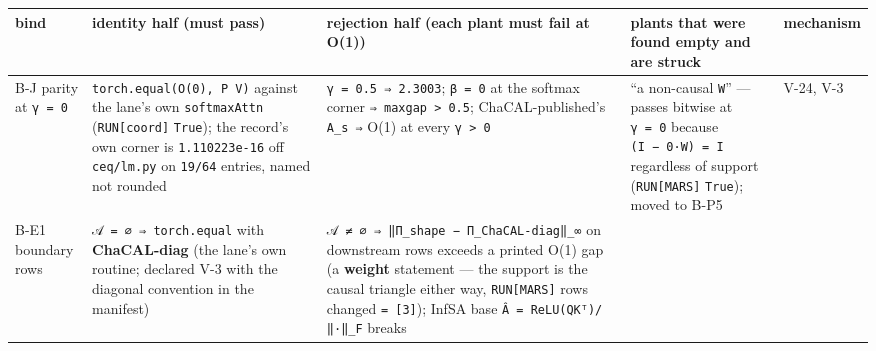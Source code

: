 \documentclass[11pt,a4paper]{article}
\newcounter{none}                 %
\theoremstyle{plain}
\theoremstyle{definition}
\theoremstyle{remark}
\begin{document}
{\def\LTcaptype{none} %
\begin{longtable}[]{@{}
  >{\raggedright\arraybackslash}p{}
  >{\raggedright\arraybackslash}p{}
  >{\raggedright\arraybackslash}p{}
  >{\raggedright\arraybackslash}p{}
  >{\raggedright\arraybackslash}p{}@{}}
\toprule\noalign{}
\begin{minipage}[b]{\linewidth}\raggedright
bind
\end{minipage} & \begin{minipage}[b]{\linewidth}\raggedright
identity half (must pass)
\end{minipage} & \begin{minipage}[b]{\linewidth}\raggedright
rejection half (each plant must fail at O(1))
\end{minipage} & \begin{minipage}[b]{\linewidth}\raggedright
plants that were found empty and are struck
\end{minipage} & \begin{minipage}[b]{\linewidth}\raggedright
mechanism
\end{minipage} \\
\midrule\noalign{}
\endhead
\bottomrule\noalign{}
\endlastfoot
B-J parity at \texttt{γ\ =\ 0} & \texttt{torch.equal(O(0),\ P\ V)}
against the lane's own \texttt{softmaxAttn} (\texttt{RUN{[}coord{]}}
\texttt{True}); the record's own corner is \texttt{1.110223e-16} off
\texttt{ceq/lm.py} on \texttt{19/64} entries, named not rounded &
\texttt{γ\ =\ 0.5\ ⇒\ 2.3003}; \texttt{β\ =\ 0} at the softmax corner
\texttt{⇒\ max\textbar{}gap\textbar{}\ \textgreater{}\ 0.5};
ChaCAL-published's \texttt{A\_s\ ⇒} O(1) at every
\texttt{γ\ \textgreater{}\ 0} & ``a non-causal \texttt{W}'' --- passes
bitwise at \texttt{γ\ =\ 0} because \texttt{(I\ −\ 0·W)\ =\ I}
regardless of support (\texttt{RUN{[}MARS{]}} \texttt{True}); moved to
B-P5 & V-24, V-3 \\
B-E1 boundary rows & \texttt{𝒜\ =\ ∅\ ⇒\ torch.equal} with
\textbf{ChaCAL-diag} (the lane's own routine; declared V-3 with the
diagonal convention in the manifest) &
\texttt{𝒜\ ≠\ ∅\ ⇒\ ‖Π\_shape\ −\ Π\_ChaCAL-diag‖\_∞} on downstream rows
exceeds a printed O(1) gap (a \textbf{weight} statement --- the support
is the causal triangle either way, \texttt{RUN{[}MARS{]}} rows changed
\texttt{=\ {[}3{]}}); InfSA base \texttt{Â\ =\ ReLU(QKᵀ)/‖·‖\_F} breaks

\end{longtable}}
\end{document}
